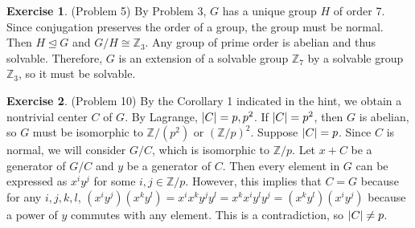 \documentclass[12pt, psamsfonts]{amsart}
\theoremstyle{definition}
\newtheorem*{exer}{Exercise}
\theoremstyle{remark}
\numberwithin{equation}{section}
\begin{document}
\begin{exer}{(Problem 5)}
  By Problem 3, $G$ has a unique group $H$ of order 7.
  Since conjugation preserves the order of a group, the group must be normal.
  Then $H \trianglelefteq G$ and $G / H \cong \mathbb{Z}_3$.
  Any group of prime order is abelian and thus solvable.
  Therefore, $G$ is an extension of a solvable group $\mathbb{Z}_7$ by a solvable group $\mathbb{Z}_3$, so it must be solvable.
\end{exer}

\begin{exer}{(Problem 10)}
  By the Corollary 1 indicated in the hint, we obtain a nontrivial center $C$ of $G$.
  By Lagrange, $\abs{C} = p, p^2$.
  If $\abs{C} = p^2$, then $G$ is abelian, so $G$ must be isomorphic to $\mathbb{Z} / (p^2)$ or $(\mathbb{Z} / p)^2$.
  Suppose $\abs{C} = p$.
  Since $C$ is normal, we will consider $G / C$, which is isomorphic to $\mathbb{Z} / p$.
  Let $x + C$ be a generator of $G / C$ and $y$ be a generator of $C$.
  Then every element in $G$ can be expressed as $x^iy^j$ for some $i, j \in \mathbb{Z}/p$.
  However, this implies that $C = G$ because for any $i, j, k, l$, $(x^iy^j)(x^ky^l) = x^ix^ky^jy^l = x^kx^iy^ly^j = (x^ky^l)(x^iy^j)$ because a power of $y$ commutes with any element.
  This is a contradiction, so $\abs{C} \ne p$.
\end{exer}
\end{document}

